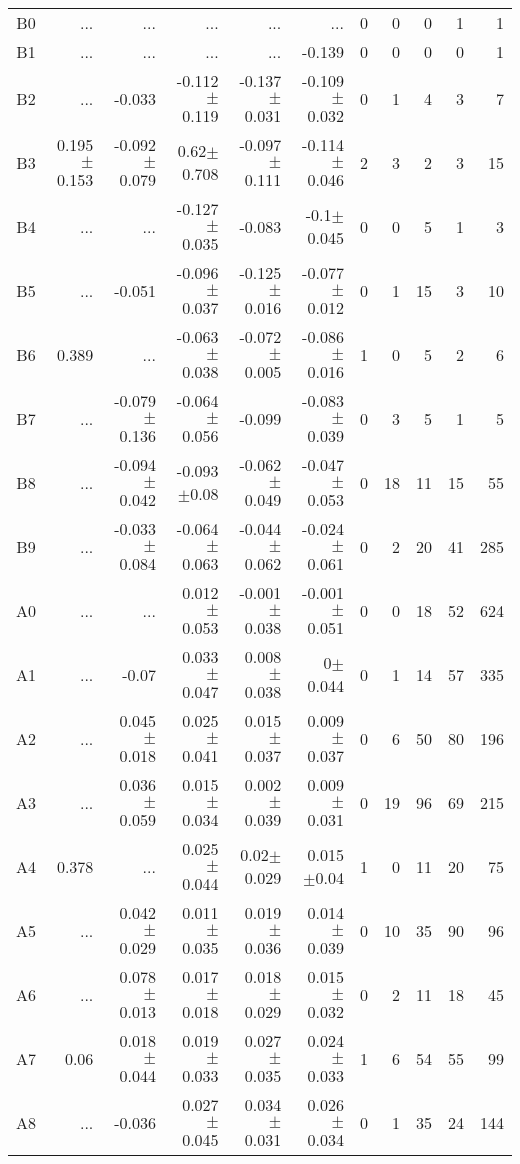 \begin{table}[t]
\begin{table}[t]
\begin{center}
\begin{tabular}{c|rrrrr|rrrrr}
    B0	&	 ...	&	 ...	&	 ...	&	 ...	&	 ...	&	0	&	0	&	0	&	1	&	1	\\
    B1	&	 ...	&	 ...	&	 ...	&	 ...	&	-0.139	&	0	&	0	&	0	&	0	&	1	\\
    B2	&	 ...	&	-0.033	&	-0.112$\pm$0.119	&	-0.137$\pm$0.031	&	-0.109$\pm$0.032	&	0	&	1	&	4	&	3	&	7	\\
    B3	&	0.195$\pm$0.153	&	-0.092$\pm$0.079	&	0.62$\pm$0.708	&	-0.097$\pm$0.111	&	-0.114$\pm$0.046	&	2	&	3	&	2	&	3	&	15	\\
    B4	&	 ...	&	 ...	&	-0.127$\pm$0.035	&	-0.083	&	-0.1$\pm$0.045	&	0	&	0	&	5	&	1	&	3	\\
    B5	&	 ...	&	-0.051	&	-0.096$\pm$0.037	&	-0.125$\pm$0.016	&	-0.077$\pm$0.012	&	0	&	1	&	15	&	3	&	10	\\
    B6	&	0.389	&	 ...	&	-0.063$\pm$0.038	&	-0.072$\pm$0.005	&	-0.086$\pm$0.016	&	1	&	0	&	5	&	2	&	6	\\
    B7	&	 ...	&	-0.079$\pm$0.136	&	-0.064$\pm$0.056	&	-0.099	&	-0.083$\pm$0.039	&	0	&	3	&	5	&	1	&	5	\\
    B8	&	 ...	&	-0.094$\pm$0.042	&	-0.093$\pm$0.08	&	-0.062$\pm$0.049	&	-0.047$\pm$0.053	&	0	&	18	&	11	&	15	&	55	\\
    B9	&	 ...	&	-0.033$\pm$0.084	&	-0.064$\pm$0.063	&	-0.044$\pm$0.062	&	-0.024$\pm$0.061	&	0	&	2	&	20	&	41	&	285	\\
    A0	&	 ...	&	 ...	&	0.012$\pm$0.053	&	-0.001$\pm$0.038	&	-0.001$\pm$0.051	&	0	&	0	&	18	&	52	&	624	\\
    A1	&	 ...	&	-0.07	&	0.033$\pm$0.047	&	0.008$\pm$0.038	&	0$\pm$0.044	&	0	&	1	&	14	&	57	&	335	\\
    A2	&	 ...	&	0.045$\pm$0.018	&	0.025$\pm$0.041	&	0.015$\pm$0.037	&	0.009$\pm$0.037	&	0	&	6	&	50	&	80	&	196	\\
    A3	&	 ...	&	0.036$\pm$0.059	&	0.015$\pm$0.034	&	0.002$\pm$0.039	&	0.009$\pm$0.031	&	0	&	19	&	96	&	69	&	215	\\
    A4	&	0.378	&	 ...	&	0.025$\pm$0.044	&	0.02$\pm$0.029	&	0.015$\pm$0.04	&	1	&	0	&	11	&	20	&	75	\\
    A5	&	 ...	&	0.042$\pm$0.029	&	0.011$\pm$0.035	&	0.019$\pm$0.036	&	0.014$\pm$0.039	&	0	&	10	&	35	&	90	&	96	\\
    A6	&	 ...	&	0.078$\pm$0.013	&	0.017$\pm$0.018	&	0.018$\pm$0.029	&	0.015$\pm$0.032	&	0	&	2	&	11	&	18	&	45	\\
    A7	&	0.06	&	0.018$\pm$0.044	&	0.019$\pm$0.033	&	0.027$\pm$0.035	&	0.024$\pm$0.033	&	1	&	6	&	54	&	55	&	99	\\
    A8	&	 ...	&	-0.036	&	0.027$\pm$0.045	&	0.034$\pm$0.031	&	0.026$\pm$0.034	&	0	&	1	&	35	&	24	&	144	\\

\end{tabular}
\end{center}
\end{table}
\end{table}
